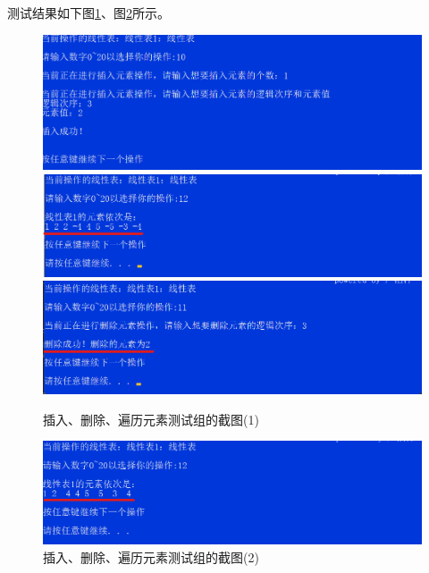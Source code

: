 \documentclass[supercite]{Experimental_Report}
\theoremstyle{definition}
\begin{document}
\begin{enumerate}
	测试结果如下图\ref{fig1-16}、图\ref{fig1-17}所示。
	\begin{figure}[htb] %
		\begin{center}
			\includegraphics[scale=0.6]{./images/顺序表/10.png}
			\includegraphics[scale=0.6]{./images/顺序表/12_1.png}
			\includegraphics[scale=0.6]{./images/顺序表/11.png}
			\caption{插入、删除、遍历元素测试组的截图(1)}
			\label{fig1-16}
		\end{center}
	\end{figure}
	\begin{figure}[htb] %
		\begin{center}
			\includegraphics[scale=0.6]{./images/顺序表/12_2.png}
			\caption{插入、删除、遍历元素测试组的截图(2)}
			\label{fig1-17}
		\end{center}
	\end{figure}


\end{enumerate}
\end{document}
